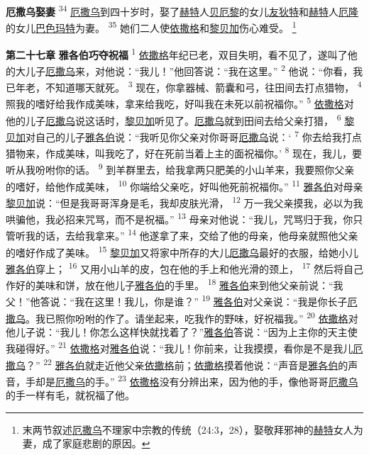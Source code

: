 \textbf{厄撒乌娶妻 }
\textsuperscript{34}
\uline{厄撒乌}到四十岁时，娶了\uline{赫特}人\uline{贝厄黎}的女儿\uline{友狄特}和\uline{赫特}人\uline{厄隆}的女儿\uline{巴色玛特}为妻。
\textsuperscript{35}
她们二人使\uline{依撒格}和\uline{黎贝加}伤心难受。
\footnote{末两节叙述\uline{厄撒乌}不理家中宗教的传统（24:3，28），娶敬拜邪神的\uline{赫特}女人为妻，成了家庭悲剧的原因。}

\textbf{第二十七章 }
\textbf{雅各伯巧夺祝福 }
\textsuperscript{1}
\uline{依撒格}年纪已老，双目失明，看不见了，遂叫了他的大儿子\uline{厄撒乌}来，对他说：“我儿！”他回答说：“我在这里。”
\textsuperscript{2}
他说：“你看，我已年老，不知道哪天就死。
\textsuperscript{3}
现在，你拿器械、箭囊和弓，往田间去打点猎物，
\textsuperscript{4}
照我的嗜好给我作成美味，拿来给我吃，好叫我在未死以前祝福你。”
\textsuperscript{5}
\uline{依撒格}对他的儿子\uline{厄撒乌}说这话时，\uline{黎贝加}听见了。\uline{厄撒乌}就到田间去给父亲打猎，
\textsuperscript{6}
\uline{黎贝加}对自己的儿子\uline{雅各伯}说：“我听见你父亲对你哥哥\uline{厄撒乌}说：‘
\textsuperscript{7}
你去给我打点猎物来，作成美味，叫我吃了，好在死前当着上主的面祝福你。’
\textsuperscript{8}
现在，我儿，要听从我吩咐你的话。
\textsuperscript{9}
到羊群里去，给我拿两只肥美的小山羊来，我要照你父亲的嗜好，给他作成美味，
\textsuperscript{10}
你端给父亲吃，好叫他死前祝福你。”
\textsuperscript{11}
\uline{雅各伯}对母亲\uline{黎贝加}说：“但是我哥哥浑身是毛，我却皮肤光滑，
\textsuperscript{12}
万一我父亲摸我，必以为我哄骗他，我必招来咒骂，而不是祝福。”
\textsuperscript{13}
母亲对他说：“我儿，咒骂归于我，你只管听我的话，去给我拿来。”
\textsuperscript{14}
他遂拿了来，交给了他的母亲，他母亲就照他父亲的嗜好作成了美味。
\textsuperscript{15}
\uline{黎贝加}又将家中所存的大儿\uline{厄撒乌}最好的衣服，给她小儿\uline{雅各伯}穿上；
\textsuperscript{16}
又用小山羊的皮，包在他的手上和他光滑的颈上，
\textsuperscript{17}
然后将自己作好的美味和饼，放在他儿子\uline{雅各伯}的手里。
\textsuperscript{18}
\uline{雅各伯}来到他父亲前说：“我父！”他答说：“我在这里！我儿，你是谁？”
\textsuperscript{19}
\uline{雅各伯}对父亲说：“我是你长子\uline{厄撒乌}。我已照你吩咐的作了。请坐起来，吃我作的野味，好祝福我。”
\textsuperscript{20}
\uline{依撒格}对他儿子说：“我儿！你怎么这样快就找着了？”\uline{雅各伯}答说：“因为上主你的天主使我碰得好。”
\textsuperscript{21}
\uline{依撒格}对\uline{雅各伯}说：“我儿！你前来，让我摸摸，看你是不是我儿\uline{厄撒乌}？”
\textsuperscript{22}
\uline{雅各伯}就走近他父亲\uline{依撒格}前；\uline{依撒格}摸着他说：“声音是\uline{雅各伯}的声音，手却是\uline{厄撒乌}的手。”
\textsuperscript{23}
\uline{依撒格}没有分辨出来，因为他的手，像他哥哥\uline{厄撒乌}的手一样有毛，就祝福了他。

